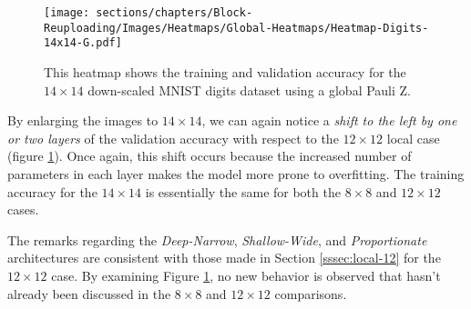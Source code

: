 \begin{figure}[h]
    \centering
    \texttt{[image: sections/chapters/Block-Reuploading/Images/Heatmaps/Global-Heatmaps/Heatmap-Digits-14x14-G.pdf]}
    \caption{This heatmap shows the training and validation accuracy for the $14\times14$ 
    down-scaled MNIST digits dataset using a global Pauli Z.}
    \label{fig:heatmap-14x14-G}
\end{figure}


By enlarging the images to $14\times14$, we can again notice a \textit{shift to the left by 
one or two layers} of the validation accuracy with respect to the $12\times12$ local case (figure 
\ref{fig:heatmap-14x14-G}). Once again, this shift 
occurs because the increased number of parameters in each layer makes the model more prone to overfitting.
The training accuracy for the $14\times14$ is essentially the same for both the $8\times8$ and 
$12\times12$ cases.

The remarks regarding the \textit{Deep-Narrow}, \textit{Shallow-Wide}, and \textit{Proportionate} 
architectures are consistent with those made in Section \ref{sssec:local-12} for the $12\times12$ case.
By examining Figure \ref{fig:heatmap-14x14-G}, no new behavior is observed that hasn't already 
been discussed in the $8\times8$ and $12\times12$ comparisons.
